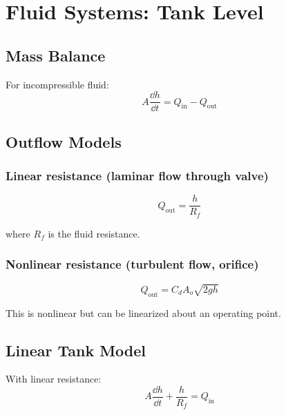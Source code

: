 \section{Fluid Systems: Tank Level}
\label{sec:tank_level}



\subsection{Mass Balance}

For incompressible fluid:
\begin{equation}
A\frac{\dd h}{\dd t} = Q_{\text{in}} - Q_{\text{out}}
\end{equation}

\subsection{Outflow Models}

\subsubsection{Linear resistance (laminar flow through valve)}
\begin{equation}
Q_{\text{out}} = \frac{h}{R_f}
\end{equation}

where $R_f$ is the fluid resistance.

\subsubsection{Nonlinear resistance (turbulent flow, orifice)}
\begin{equation}
Q_{\text{out}} = C_d A_o \sqrt{2gh}
\end{equation}

This is nonlinear but can be linearized about an operating point.

\subsection{Linear Tank Model}

With linear resistance:
\begin{equation}
A\frac{\dd h}{\dd t} + \frac{h}{R_f} = Q_{\text{in}}
\end{equation}

